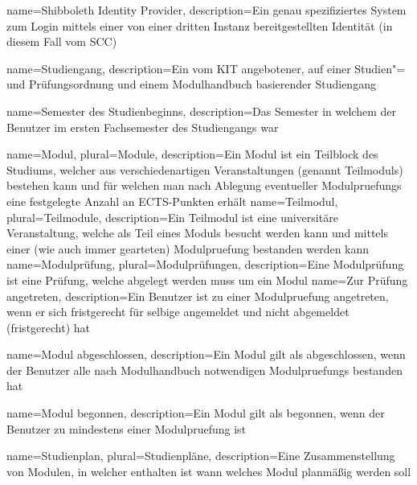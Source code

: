 {
	name=Shibboleth Identity Provider,
	description={Ein genau spezifiziertes System zum Login mittels einer von einer dritten Instanz bereitgestellten Identität (in diesem Fall vom \gls{SCC})}
}

{
	name=Studiengang,
	description={Ein vom KIT angebotener, auf einer Studien"= und Prüfungsordnung und einem Modulhandbuch basierender Studiengang}
}

{
	name=Semester des Studienbeginns,
	description={Das Semester in welchem der \gls{Benutzer} im ersten Fachsemester des \gls{Studiengang}s war}
}

{
	name=Modul,
	plural=Module,
	description={Ein Modul ist ein Teilblock des Studiums, welcher aus verschiedenartigen Veranstaltungen (genannt \glspl{Teilmodul}) bestehen kann und für welchen man nach Ablegung eventueller \glspl{Modulpruefung} eine festgelegte Anzahl an ECTS-Punkten erhält}
}
{
	name=Teilmodul,
	plural=Teilmodule,
	description={Ein Teilmodul ist eine universitäre Veranstaltung, welche als Teil eines Moduls besucht werden kann und mittels einer (wie auch immer gearteten) \gls{Modulpruefung} bestanden werden kann}
}
{
	name=Modulprüfung,
	plural=Modulprüfungen,
	description={Eine Modulprüfung ist eine Prüfung, welche abgelegt werden muss um ein Modul }
}
{
	name=Zur Prüfung angetreten,
	description={Ein \gls{Benutzer} ist zu einer \gls{Modulpruefung} angetreten, wenn er sich fristgerecht für selbige angemeldet und nicht abgemeldet (fristgerecht) hat}
}

{
	name=Modul abgeschlossen,
	description={Ein \gls{Modul} gilt als abgeschlossen, wenn der \gls{Benutzer} alle nach Modulhandbuch notwendigen \glspl{Modulpruefung} bestanden hat}
}

{
	name=Modul begonnen,
	description={Ein \gls{Modul} gilt als begonnen, wenn der \gls{Benutzer} zu mindestens einer \gls{Modulpruefung}  ist}
}

{
	name=Studienplan,
	plural=Studienpläne,
	description={Eine Zusammenstellung von Modulen, in welcher enthalten ist wann welches Modul planmäßig  werden soll}
}


